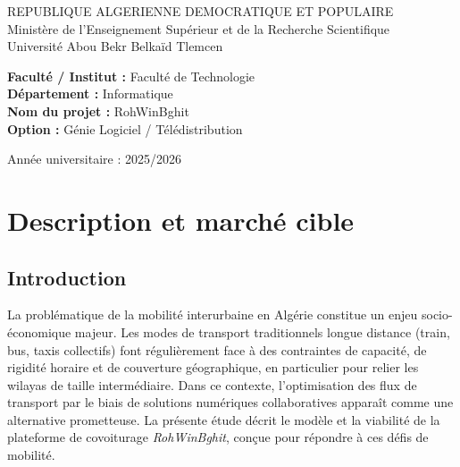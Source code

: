 \documentclass[11pt,a4paper]{article}
\begin{document}
\begin{titlepage}
\centering
\vspace*{1cm}
{\small REPUBLIQUE ALGERIENNE DEMOCRATIQUE ET POPULAIRE\\
Ministère de l'Enseignement Supérieur et de la Recherche Scientifique\\
Université Abou Bekr Belkaïd Tlemcen\par}
\vspace{2cm}
\vspace{2.5cm}

\begin{flushleft}
\textbf{Faculté / Institut :} Faculté de Technologie \\[6pt]
\textbf{Département :} Informatique \\[6pt]
\textbf{Nom du projet :} RohWinBghit \\[6pt]
\textbf{Option :} Génie Logiciel / Télédistribution
\end{flushleft}

\vfill
{\small Année universitaire : 2025/2026\par}
\end{titlepage}

\section{Description et marché cible}

\subsection{Introduction}
La problématique de la mobilité interurbaine en Algérie constitue un enjeu socio-économique majeur. Les modes de transport traditionnels longue distance (train, bus, taxis collectifs) font régulièrement face à des contraintes de capacité, de rigidité horaire et de couverture géographique, en particulier pour relier les wilayas de taille intermédiaire. Dans ce contexte, l'optimisation des flux de transport par le biais de solutions numériques collaboratives apparaît comme une alternative prometteuse. La présente étude décrit le modèle et la viabilité de la plateforme de covoiturage \textit{RohWinBghit}, conçue pour répondre à ces défis de mobilité.
\end{document}
